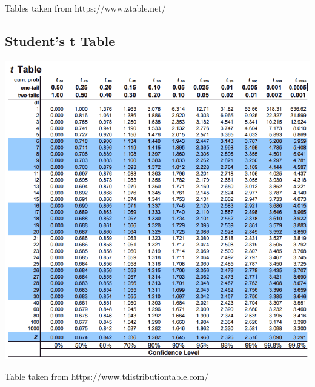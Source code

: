 \documentclass[12pt,letterpaper]{article} \usepackage{amsmath} \usepackage{graphicx} \usepackage[margin=1in]{geometry} \usepackage{longtable}  \usepackage{amssymb}
\begin{document}
	Tables taken from https://www.ztable.net/
	
	\subsection{Student's t Table}
	\begin{center}
		\includegraphics[width=0.99\linewidth]{t-table}
	\end{center}
	Table taken from https://www.tdistributiontable.com/
	
	
\end{document}
